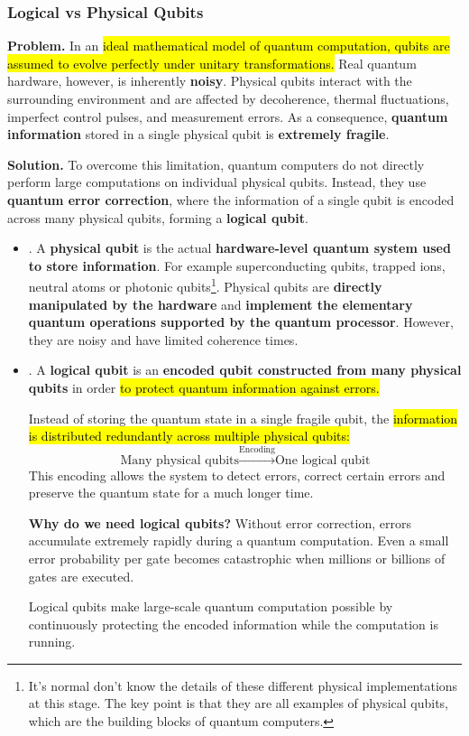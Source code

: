 \subsubsection{Logical vs Physical Qubits}\label{sec:logical-vs-physical-qubits}

\textcolor{Red2}{ \textbf{Problem.}} In an \hl{ideal mathematical model of quantum computation, qubits are assumed to evolve perfectly under unitary transformations.} Real quantum hardware, however, is inherently \textbf{noisy}. Physical qubits interact with the surrounding environment and are affected by decoherence, thermal fluctuations, imperfect control pulses, and measurement errors. As a consequence, \textbf{quantum information} stored in a single physical qubit is \textbf{extremely fragile}.

\highspace
\textcolor{Green3}{ \textbf{Solution.}} To overcome this limitation, quantum computers do not directly perform large computations on individual physical qubits. Instead, they use \textbf{quantum error correction}, where the information of a single qubit is encoded across many physical qubits, forming a \textbf{logical qubit}.
\begin{itemize}
    \item {}. A \textbf{physical qubit} is the actual \textbf{hardware-level quantum system used to store information}. For example superconducting qubits, trapped ions, neutral atoms or photonic qubits\footnote{%
        It's normal don't know the details of these different physical implementations at this stage. The key point is that they are all examples of physical qubits, which are the building blocks of quantum computers.
    }. Physical qubits are \textbf{directly manipulated by the hardware} and \textbf{implement the elementary quantum operations supported by the quantum processor}. However, they are noisy and have limited coherence times.


    \item {}. A \textbf{logical qubit} is an \textbf{encoded qubit constructed from many physical qubits} in order \hl{to protect quantum information against errors.}

    Instead of storing the quantum state in a single fragile qubit, the \hl{information is distributed redundantly across multiple physical qubits:}
    \begin{equation*}
        \text{Many physical qubits} \xrightarrow{\text{Encoding}} \text{One logical qubit}
    \end{equation*}
    This encoding allows the system to detect errors, correct certain errors and preserve the quantum state for a much longer time.

    \textcolor{Green3}{ \textbf{Why do we need logical qubits?}} 
    Without error correction, errors accumulate extremely rapidly during a quantum computation. Even a small error probability per gate becomes catastrophic when millions or billions of gates are executed.

    Logical qubits make large-scale quantum computation possible by continuously protecting the encoded information while the computation is running.
\end{itemize}
